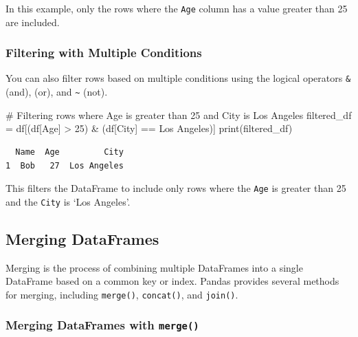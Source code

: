\documentclass[
  letterpaper,
  DIV=11,
  numbers=noendperiod]{scrreprt}
\newenvironment{Shaded}{\begin{snugshade}}{\end{snugshade}}
\newcommand{\BuiltInTok}[1]{\textcolor[rgb]{0.00,0.23,0.31}{#1}}
\newcommand{\CommentTok}[1]{\textcolor[rgb]{0.37,0.37,0.37}{#1}}
\newcommand{\DecValTok}[1]{\textcolor[rgb]{0.68,0.00,0.00}{#1}}
\newcommand{\NormalTok}[1]{\textcolor[rgb]{0.00,0.23,0.31}{#1}}
\newcommand{\OperatorTok}[1]{\textcolor[rgb]{0.37,0.37,0.37}{#1}}
\newcommand{\StringTok}[1]{\textcolor[rgb]{0.13,0.47,0.30}{#1}}
\begin{document}
In this example, only the rows where the \texttt{Age} column has a value
greater than 25 are included.

\hypertarget{filtering-with-multiple-conditions}{%
\subsubsection{Filtering with Multiple
Conditions}\label{filtering-with-multiple-conditions}}

You can also filter rows based on multiple conditions using the logical
operators \texttt{\&} (and), \texttt{\textbar{}} (or), and
\texttt{\textasciitilde{}} (not).

\begin{Shaded}
\begin{Highlighting}[]
\CommentTok{\# Filtering rows where Age is greater than 25 and City is \textquotesingle{}Los Angeles\textquotesingle{}}
\NormalTok{filtered\_df }\OperatorTok{=}\NormalTok{ df[(df[}\StringTok{\textquotesingle{}Age\textquotesingle{}}\NormalTok{] }\OperatorTok{\textgreater{}} \DecValTok{25}\NormalTok{) }\OperatorTok{\&}\NormalTok{ (df[}\StringTok{\textquotesingle{}City\textquotesingle{}}\NormalTok{] }\OperatorTok{==} \StringTok{\textquotesingle{}Los Angeles\textquotesingle{}}\NormalTok{)]}
\BuiltInTok{print}\NormalTok{(filtered\_df)}
\end{Highlighting}
\end{Shaded}

\begin{verbatim}
  Name  Age         City
1  Bob   27  Los Angeles
\end{verbatim}

This filters the DataFrame to include only rows where the \texttt{Age}
is greater than 25 and the \texttt{City} is `Los Angeles'.

\hypertarget{merging-dataframes}{%
\subsection{Merging DataFrames}\label{merging-dataframes}}

Merging is the process of combining multiple DataFrames into a single
DataFrame based on a common key or index. Pandas provides several
methods for merging, including \texttt{merge()}, \texttt{concat()}, and
\texttt{join()}.

\hypertarget{merging-dataframes-with-merge}{%
\subsubsection{\texorpdfstring{Merging DataFrames with
\texttt{merge()}}{Merging DataFrames with merge()}}\label{merging-dataframes-with-merge}}
\end{document}
